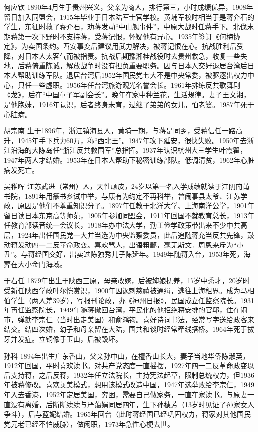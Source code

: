 \begin{description*}
    \item[何应钦] 1890年4月生于贵州兴义，父亲为商人，排行第三，小时成绩优异，1908年留日加入同盟会，1915年毕业于日本陆军士官学校。黄埔军校时相当于是蒋介石的学生，东征时救了蒋介石，劝蒋发动“中山舰事件”，中原大战时任蒋手下。北伐末期蒋第一次下野时不支持蒋，受蒋记恨，怀疑他有异心。1935年签订《何梅协定》，为卖国条约。西安事变后建议用武力解决，被蒋记恨在心。抗战胜利后受降，对日本人太客气而被指责。抗战后期豫湘桂战役时去贵州救急，收复一些失地，后蒋倚重陈诚，解放战争时没有担负重要职务。因与日本人交好退居台湾后日本人帮助训练军队。退居台湾后1952年国民党七大不是中央常委，被驱逐出权力中心，只任一些虚职。1956年任台湾旅游观光名誉会长。1961年排练反共歌舞剧《龙》，后在“中国童子军副会长”。晚年在家中种兰花，生活规律。妻子王文湘，是他胞妹，1916年认识，后者终身未育，过继了弟弟的女儿，怕老婆。1987年死于心脏病。
    \item[胡宗南] 生于1896年，浙江镇海县人，黄埔一期，与蒋是同乡，受蒋信任一路高升，1945年手下兵力60万，称“西北王”。1947年攻下延安，很快失败。1950年去浙江沿海的大陈岛任“浙江反共救国军”总指挥。1937年认识杭州大三学生叶霞翟，1947年两人才结婚。1953年在日本人帮助下秘密训练部队。低调清贫，1962年心脏病发死亡。
    \item[吴稚晖] 江苏武进（常州）人，天性顽皮，24岁以第一名入学成绩就读于江阴南莆书院，1891年用篆书乡试中举，与康有为约定不再科举，曾闹事县太爷、江苏学政，原因是他们不尊重知识分子。1897年任教于北洋大学、上海南洋公学，1901年留日读日本东京高等师范，1905年参加同盟会，1911年回国不就教育总长，1913年任教育部读音统一会议长，1918年办中法大学，勤工俭学政策带出来不少中共高层，1924年出任国民党一大并当选为中央监察委员，此后追随蒋充当反共先锋，鼓动蒋发动四一二反革命政变。喜欢骂人，出语粗鄙，毫无斯文，周恩来斥为“小丑”。与蒋经国交好，出卖过陈独秀儿子陈延年。1949年随蒋入台，1953年死，海葬在大小金门海域。
    \item[于右任] 1879年出生于陕西三原，母亲改嫁，后被婶娘抚养，17岁中秀才，20岁时受新任陕西学政叶尔恺赏识，1900年因讽刺慈禧被通缉，逃往上海租界。成为马相伯学生（两人差39岁），写报刊论政，办《神州日报》，民国成立任监察院长。1931年再任监察院长，1949年随蒋撤回台湾，平民化的他拒绝蒋安排的官邸，住在闹市，弹劾李宗仁（当时出走美国）和俞鸿钧。喜好诗词书法，经常写字送给政客来结交。结四次婚，幼子和母亲留在大陆，国共和谈时经常牵线搭桥。1964年死于拔牙并发症。立铜像于玉山，后被毁坏。
    \item[孙科] 1894年出生广东香山，父亲孙中山，在檀香山长大，妻子当地华侨陈淑英，1912年回国，平时喜欢读书。对共产党态度一直摇摆，1927年四一二反革命政变以后支持蒋，之后反蒋，1932年任立法院长，主持宪法起草，限制总统权力，但1936年被蒋修改。喜欢英美模式，想用该模式改造中国，1947年选举败给李宗仁，1949年入去香港，1952年定居美国，穷困，需要自己做家务，一直在家读书。与原妻一直没有离婚，后断断续续与严蔼娟同居四年，生下孙穗芳（13岁时见证了孙家女人争斗），后与蓝妮结婚。1965年回台（此时蒋经国已经巩固权力，蒋家对其他国民党元老已经不怕威胁），做闲职，1973年急性心梗去世。

\end{description*}
